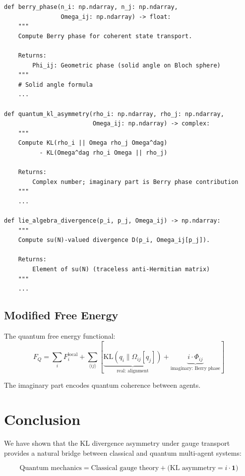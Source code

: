 \documentclass[11pt,a4paper]{article}
\newcommand{\KL}{\mathrm{KL}}
\newcommand{\id}{\mathbf{1}}
\begin{document}
\begin{verbatim}
def berry_phase(n_i: np.ndarray, n_j: np.ndarray,
                Omega_ij: np.ndarray) -> float:
    """
    Compute Berry phase for coherent state transport.

    Returns:
        Phi_ij: Geometric phase (solid angle on Bloch sphere)
    """
    # Solid angle formula
    ...

def quantum_kl_asymmetry(rho_i: np.ndarray, rho_j: np.ndarray,
                         Omega_ij: np.ndarray) -> complex:
    """
    Compute KL(rho_i || Omega rho_j Omega^dag)
          - KL(Omega^dag rho_i Omega || rho_j)

    Returns:
        Complex number; imaginary part is Berry phase contribution
    """
    ...

def lie_algebra_divergence(p_i, p_j, Omega_ij) -> np.ndarray:
    """
    Compute su(N)-valued divergence D(p_i, Omega_ij[p_j]).

    Returns:
        Element of su(N) (traceless anti-Hermitian matrix)
    """
    ...
\end{verbatim}

\subsection{Modified Free Energy}

The quantum free energy functional:
\begin{equation}
    F_Q = \sum_i F_i^{\text{local}} + \sum_{\langle ij \rangle} \left[\underbrace{\KL(q_i \| \Omega_{ij}[q_j])}_{\text{real: alignment}} + \underbrace{i \cdot \Phi_{ij}}_{\text{imaginary: Berry phase}}\right]
\end{equation}

The imaginary part encodes quantum coherence between agents.

\section{Conclusion}

We have shown that the KL divergence asymmetry under gauge transport provides a natural bridge between classical and quantum multi-agent systems:

\begin{keyresult}
\begin{equation}
    \boxed{\text{Quantum mechanics} = \text{Classical gauge theory} + \text{(KL asymmetry} = i \cdot \id\text{)}}
\end{equation}
\end{keyresult}
\end{document}
